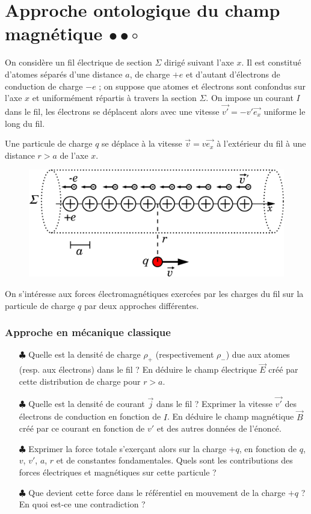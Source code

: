 \documentclass{report}
\begin{document}
\section*{Approche ontologique du champ magnétique $\bullet\bullet\circ$}

On considère un fil électrique de section $\Sigma$ dirigé suivant l'axe $x$. Il est constitué d'atomes séparés d'une distance $a$, de charge $+e$  et d'autant d'électrons de conduction de charge $-e$ ; on suppose que atomes et électrons sont confondus sur l'axe $x$ et uniformément répartis à travers la section $\Sigma$. On impose un courant $I$ dans le fil, les électrons se déplacent alors avec une vitesse $\vec{v'}=-v'\vec{e_{x}}$ uniforme le long du fil.

Une particule de charge $q$ se déplace à la vitesse $\vec{v}=v\vec{e_{x}}$ à l'extérieur du fil à une distance $r>a$ de l'axe $x$.

\begin{figure}[h!]
\centering
		\includegraphics[scale=0.25]{cable.pdf}
\end{figure}

On s'intéresse aux forces électromagnétiques exercées par les charges du fil sur la particule de charge $q$ par deux approches différentes.

\subsubsection*{Approche en mécanique classique}

\begin{itemize}
	\item[$\clubsuit$] Quelle est la densité de charge $\rho_{+}$ (respectivement $\rho_{-}$) due aux atomes (resp. aux électrons) dans le fil ? En déduire le champ électrique $\vec{E}$ créé par cette distribution de charge pour $r>a$.
	
	\item[$\clubsuit$] Quelle est la densité de courant $\vec{j}$ dans le fil ? Exprimer la vitesse $\vec{v'}$ des électrons de conduction en fonction de $I$. En déduire le champ magnétique $\vec{B}$ créé par ce courant en fonction de $v'$ et des autres données de l'énoncé.
	\item[$\clubsuit$] Exprimer la force totale s'exerçant alors sur la charge $+q$, en fonction de $q$, $v$, $v'$, $a$, $r$ et de constantes fondamentales. Quels sont les contributions des forces électriques et magnétiques sur cette particule ?
	\item[$\clubsuit$] Que devient cette force dans le référentiel en mouvement de la charge $+q$ ? En quoi est-ce une contradiction ?
\end{itemize}
\end{document}
